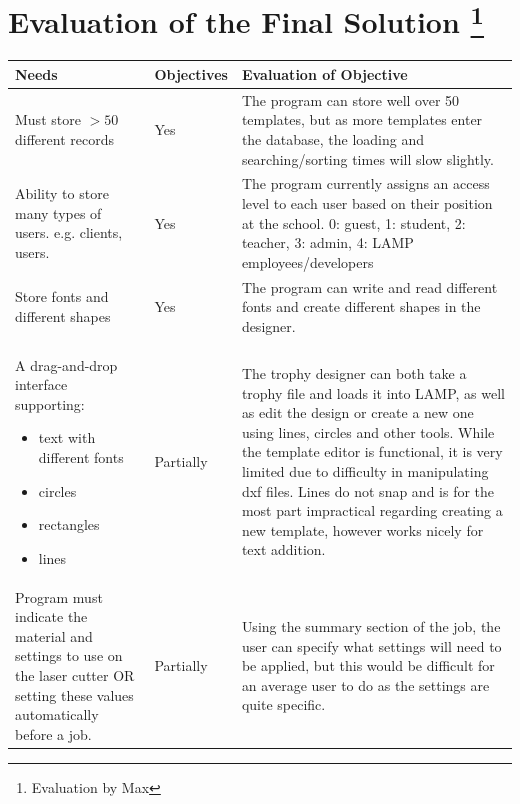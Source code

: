 \documentclass[oneside,openany,11pt,a4paper]{report}
\begin{document}
\section[Evaluation of the Final Solution]{Evaluation of the Final Solution \protect\footnote{Evaluation by Max}}
\begin{longtable}{|p{4cm}|p{2cm}|p{8cm}|}
	
	\hline
	\rowcolor{gray!50}
	\textbf{Needs} & \textbf{Objectives} & \textbf{Evaluation of Objective} \\ \hline
	
	Must store $>50$ different records & 
	Yes &
	The program can store well over 50 templates, but as more templates enter the database, the loading and searching/sorting times will slow slightly. 
	\\ \hline
	
	Ability to store many types of users. e.g. clients, users. &
	Yes &
	The program currently assigns an access level to each user based on their position at the school. 0: guest, 1: student, 2: teacher, 3: admin, 4: LAMP employees/developers 
	\\ \hline
	
	Store fonts and different shapes &
	Yes &
	The program can write and read different fonts and create different shapes in the designer.
	\\ \hline
	
	A drag-and-drop interface supporting:
	\begin{itemize}
		\itemsep0em
		\item text with different fonts
		\item circles
		\item rectangles
		\item lines
	\end{itemize} &
	Partially &
	The trophy designer can both take a trophy file and loads it into LAMP, as well as edit the design or create a new one using lines, circles and other tools. 
	\newline
	While the template editor is functional, it is very limited due to difficulty in manipulating dxf files. Lines do not snap and is for the most part impractical regarding creating a new template, however works nicely for text addition.
	\\ \hline
	
	Program must indicate the material and settings to use on the laser cutter OR setting these values automatically before a job. &
	Partially &
	Using the summary section of the job, the user can specify what settings will need to be applied, but this would be difficult for an average user to do as the settings are quite specific. 
	\\ \hline
	

\end{longtable}
\end{document}
